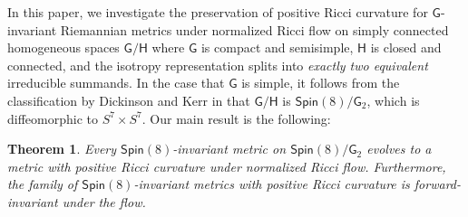 \documentclass{amsart}
\numberwithin{equation}{section}
\theoremstyle{plain}
\newtheorem{result}{Theorem}
\theoremstyle{definition}
\theoremstyle{remark}
\numberwithin{table}{section}
\newcommand{\Ffour}{\mathsf{F}_4}
\newcommand{\gG}{\mathsf{G}}
\newcommand{\gH}{\mathsf{H}}
\newcommand{\SO}{\mathsf{SO}}
\newcommand{\Sp}{\mathsf{Sp}}
\newcommand{\Spin}{\mathsf{Spin}}
\newcommand{\SU}{\mathsf{SU}}
\newcommand{\gT}{\mathsf{T}}
\begin{document}

In this paper, we investigate the preservation of positive Ricci curvature for $\gG$-invariant Riemannian metrics under normalized Ricci flow on simply connected homogeneous spaces $\gG/\gH$ where $\gG$ is compact and semisimple, $\gH$ is closed and connected, and the isotropy representation splits into \textit{exactly two equivalent} irreducible summands. 
In the case that $\gG$ is simple, it follows from the classification by Dickinson and Kerr in \cite{DickinsonKerr08} that $\gG/\gH$ is $\Spin(8)/\gG_2$, which is diffeomorphic to $S^7 \times S^7$.
Our main result is the following:

\begin{result}\label{mainthm:Ricpos}
        Every $\Spin(8)$-invariant metric on $\Spin(8)/\gG_2$ evolves to a metric with positive Ricci curvature under normalized Ricci flow.
        Furthermore, the family of $\Spin(8)$-invariant metrics with positive Ricci curvature is forward-invariant under the flow.
\end{result}
\end{document}
